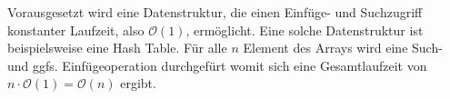 \documentclass[a4paper]{scrartcl}
\begin{document}
\vspace{1cm}

Vorausgesetzt wird eine Datenstruktur, die einen Einfüge- und Suchzugriff konstanter Laufzeit, also $\mathcal{O}(1)$, ermöglicht. Eine solche Datenstruktur ist beispielsweise eine Hash Table. Für alle $n$ Element des Arrays wird eine Such- und ggfs. Einfügeoperation durchgefürt womit sich eine Gesamtlaufzeit von $n \cdot \mathcal{O}(1) = \mathcal{O}(n)$ ergibt.
\end{document}
